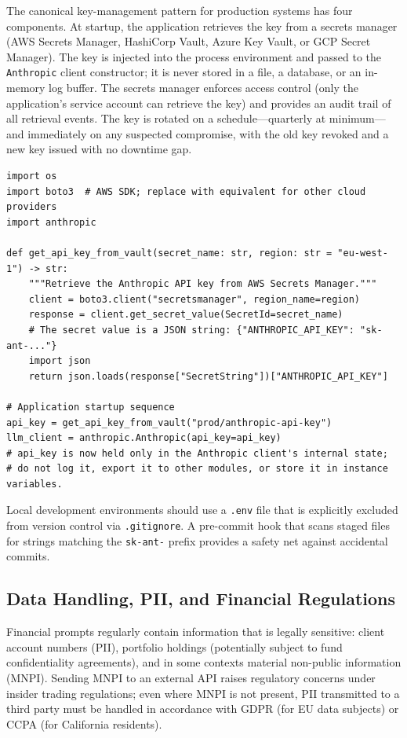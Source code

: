 The canonical key-management pattern for production systems has four components. At
startup, the application retrieves the key from a secrets manager (AWS Secrets Manager,
HashiCorp Vault, Azure Key Vault, or GCP Secret Manager). The key is injected into the
process environment and passed to the \texttt{Anthropic} client constructor; it is
never stored in a file, a database, or an in-memory log buffer. The secrets manager
enforces access control (only the application's service account can retrieve the key)
and provides an audit trail of all retrieval events. The key is rotated on a
schedule---quarterly at minimum---and immediately on any suspected compromise, with the
old key revoked and a new key issued with no downtime gap.

\begin{verbatim}
import os
import boto3  # AWS SDK; replace with equivalent for other cloud providers
import anthropic

def get_api_key_from_vault(secret_name: str, region: str = "eu-west-1") -> str:
    """Retrieve the Anthropic API key from AWS Secrets Manager."""
    client = boto3.client("secretsmanager", region_name=region)
    response = client.get_secret_value(SecretId=secret_name)
    # The secret value is a JSON string: {"ANTHROPIC_API_KEY": "sk-ant-..."}
    import json
    return json.loads(response["SecretString"])["ANTHROPIC_API_KEY"]

# Application startup sequence
api_key = get_api_key_from_vault("prod/anthropic-api-key")
llm_client = anthropic.Anthropic(api_key=api_key)
# api_key is now held only in the Anthropic client's internal state;
# do not log it, export it to other modules, or store it in instance variables.
\end{verbatim}

Local development environments should use a \texttt{.env} file that is explicitly
excluded from version control via \texttt{.gitignore}. A pre-commit hook that scans
staged files for strings matching the \texttt{sk-ant-} prefix provides a safety net
against accidental commits.

\subsection{Data Handling, PII, and Financial Regulations}
\label{app:sdk-commercial:security:pii}

Financial prompts regularly contain information that is legally sensitive: client
account numbers (PII), portfolio holdings (potentially subject to fund confidentiality
agreements), and in some contexts material non-public information (MNPI). Sending MNPI
to an external API raises regulatory concerns under insider trading regulations; even
where MNPI is not present, PII transmitted to a third party must be handled in
accordance with GDPR (for EU data subjects) or CCPA (for California residents).

